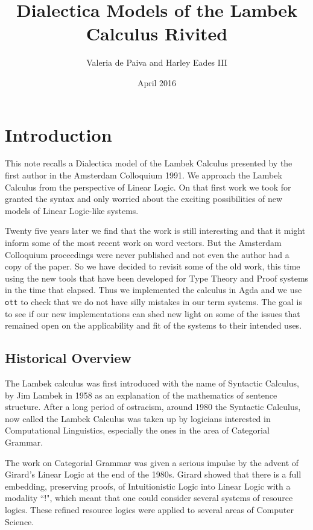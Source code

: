 \documentclass{article}
\title{Dialectica Models of the Lambek Calculus Rivited}
\author{Valeria de Paiva and Harley Eades III}
\date{April 2016}
\begin{document}
\maketitle

\section*{Introduction}
This   note recalls a Dialectica model of the Lambek Calculus presented by the first author in the Amsterdam Colloquium 1991. We approach the Lambek 
Calculus from the perspective of Linear Logic. On that first work we took for granted the syntax and only worried about the exciting possibilities of new models of Linear Logic-like systems. 

Twenty five years later we find that the work is still interesting and that it might inform some of the most recent work on word vectors. But the Amsterdam Colloquium proceedings were never published and not even the author had a copy of the paper. So we have decided to revisit some of the old work, this time using the new tools that have been developed for Type Theory and Proof systems in the time that elapsed. Thus we implemented the calculus in Agda and we use \texttt{ott} to check that we do not have silly mistakes in our term systems. The goal is to  see if our new implementations can shed new light on some of the issues that remained open on the applicability and fit of the systems to their intended uses. 

\subsection*{Historical Overview}
The Lambek calculus was first introduced  with the name of Syntactic Calculus, by Jim Lambek in 1958  as an explanation of the mathematics of sentence structure.  After a long period of ostracism, around 1980 the Syntactic Calculus, now called the Lambek Calculus was taken up by logicians interested in Computational Linguistics, especially the ones in the area of Categorial Grammar. 

The work on Categorial Grammar was given a serious impulse by  the advent of Girard's Linear Logic at the end of the 1980s.  Girard showed that there is a full embedding, preserving proofs, of Intuitionistic Logic into Linear Logic with a modality ``!", which meant that one could consider several systems of resource logics. These refined resource logics were applied to several areas of Computer Science. 
\end{document}

